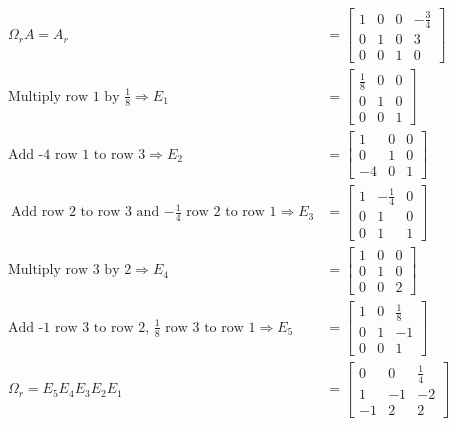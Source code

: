 \documentclass[11pt]{homework}
\begin{document}
\begin{align*}
  \Omega_r A = A_r &=
  \begin{bmatrix}
  1 & 0 & 0 & -\frac{3}{4} \\
  0 & 1 & 0 & 3 \\
  0 & 0 & 1 & 0
  \end{bmatrix} \\
\text{Multiply row 1 by $\frac{1}{8}$}
\Rightarrow
E_1 &=
  \begin{bmatrix}
    \frac{1}{8} & 0 & 0 \\
    0 & 1 & 0 \\
    0 & 0 & 1
  \end{bmatrix} \\
\text{Add -4 row 1 to row 3}
\Rightarrow
E_2 &=
  \begin{bmatrix}
    1 & 0 & 0 \\
    0 & 1 & 0 \\
    -4 & 0 & 1
  \end{bmatrix}\\\
\text{Add row 2 to row 3 and $-\frac{1}{4}$ row 2 to row 1}
\Rightarrow
E_3 &=
  \begin{bmatrix}
    1 & -\frac{1}{4} & 0 \\
    0 & 1 & 0 \\
    0 & 1 & 1
  \end{bmatrix} \\
\text{Multiply row 3 by 2}
\Rightarrow
E_4 &=
  \begin{bmatrix}
    1 & 0 & 0 \\
    0 & 1 & 0 \\
    0 & 0 & 2
  \end{bmatrix}\\
\text{Add -1 row 3 to row 2, $\frac{1}{8}$ row 3 to row 1}
\Rightarrow
E_5 &=
  \begin{bmatrix}
    1 & 0 & \frac{1}{8} \\
    0 & 1 & -1 \\
    0 & 0 & 1
  \end{bmatrix}\\
\Omega_r =E_5 E_4 E_3 E_2 E_1 &=
  \begin{bmatrix}
  0 & 0 & \frac{1}{4} \\
  1 & -1 & -2 \\
  -1& 2 & 2 
  \end{bmatrix}
\end{align*}
\end{document}
